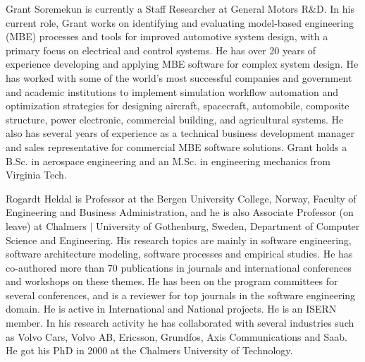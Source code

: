 \documentclass[10pt,journal,compsoc,letterpaper]{IEEEtran}
\begin{document}
\begin{IEEEbiography}{Grant Soremekun}
is currently a Staff Researcher at General Motors R\&D.
In his current role, Grant works on identifying and evaluating model-based engineering (MBE) processes and tools for improved automotive system design, with a primary focus on electrical and control systems.
He has over 20 years of experience developing and applying MBE software for complex system design.
He has worked with some of the world’s most successful companies and government and academic institutions to implement simulation workflow automation and optimization strategies for designing aircraft, spacecraft, automobile, composite structure, power electronic, commercial building, and agricultural systems.
He also has several years of experience as a technical business development manager and sales representative for commercial MBE software solutions.
Grant holds a B.Sc. in aerospace engineering and an M.Sc. in engineering mechanics from Virginia Tech.
\end{IEEEbiography}

\vfill
\newpage

\begin{IEEEbiography}{Rogardt Heldal}
is Professor at the Bergen University College, Norway, Faculty of Engineering and Business Administration, and he is also Associate Professor (on leave) at Chalmers $\mid$ University of Gothenburg, Sweden, Department of Computer Science and Engineering.
His research topics are mainly in software engineering, software architecture modeling, software processes and empirical studies.
He has co-authored more than 70 publications in journals and international conferences and workshops on these themes.
He has been on the program committees for several conferences, and is a reviewer for top journals in the software engineering domain.
He is active in International and National projects.
He is an ISERN member.
In his research activity he has collaborated with several industries such as Volvo Cars, Volvo AB, Ericsson, Grundfos, Axis Communications and Saab.
He got his PhD in 2000 at the Chalmers University of Technology.
\end{IEEEbiography}
\end{document}
